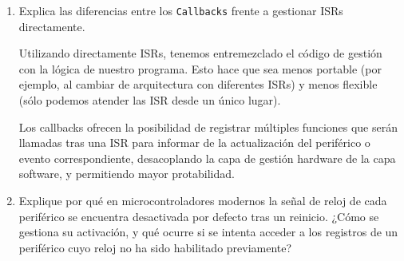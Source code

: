 \documentclass[svgnames,spanish,11pt,a4paper]{article}
\newcounter{solution}
\begin{document}
\begin{enumerate}
\begin{solution}
{
            }
            \end{solution}

        \item Explica las diferencias entre los \texttt{Callbacks} frente a gestionar ISRs directamente.
        
            \begin{solution}
                Utilizando directamente ISRs, tenemos entremezclado el código de gestión con la lógica de nuestro programa. Esto hace que sea menos portable (por ejemplo, al cambiar de arquitectura con diferentes ISRs) y menos flexible (sólo podemos atender las ISR desde un único lugar).

                Los callbacks ofrecen la posibilidad de registrar múltiples funciones que serán llamadas tras una ISR para informar de la actualización del periférico o evento correspondiente, desacoplando la capa de gestión hardware de la capa software, y permitiendo mayor protabilidad.
            \end{solution}



        \item Explique por qué en microcontroladores modernos la señal de reloj de cada periférico se encuentra desactivada por defecto tras un reinicio. ¿Cómo se gestiona su activación, y qué ocurre si se intenta acceder a los registros de un periférico cuyo reloj no ha sido habilitado previamente?   
        

\end{enumerate}
\end{document}

